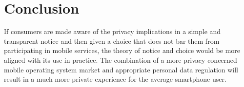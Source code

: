 \section{Conclusion}

If consumers are made aware of the privacy implications in a simple and transparent notice and then given a choice that does not bar them from participating in mobile services, the theory of notice and choice would be more aligned with its use in practice. 
The combination of a more privacy concerned mobile operating system market and appropriate personal data regulation will result in a much more private experience for the average smartphone user. 
